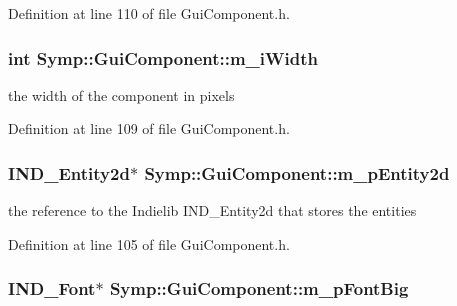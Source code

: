 Definition at line 110 of file Gui\-Component.\-h.

\hypertarget{class_symp_1_1_gui_component_ad4c3e34b824e1f9d6a030ca54fc1a7cf}{
\subsubsection[{m\-\_\-i\-Width}]{\setlength{\rightskip}{0pt plus 5cm}int Symp\-::\-Gui\-Component\-::m\-\_\-i\-Width\hspace{0.3cm}{\ttfamily [protected]}}}\label{class_symp_1_1_gui_component_ad4c3e34b824e1f9d6a030ca54fc1a7cf}
the width of the component in pixels 

Definition at line 109 of file Gui\-Component.\-h.

\hypertarget{class_symp_1_1_gui_component_ae2548627f8f866222e13347cc4284b24}{
\subsubsection[{m\-\_\-p\-Entity2d}]{\setlength{\rightskip}{0pt plus 5cm}I\-N\-D\-\_\-\-Entity2d$\ast$ Symp\-::\-Gui\-Component\-::m\-\_\-p\-Entity2d\hspace{0.3cm}{\ttfamily [protected]}}}\label{class_symp_1_1_gui_component_ae2548627f8f866222e13347cc4284b24}
the reference to the Indielib I\-N\-D\-\_\-\-Entity2d that stores the entities 

Definition at line 105 of file Gui\-Component.\-h.

\hypertarget{class_symp_1_1_gui_component_a784e1d58bb695ca95f12c1611f144488}{
\subsubsection[{m\-\_\-p\-Font\-Big}]{\setlength{\rightskip}{0pt plus 5cm}I\-N\-D\-\_\-\-Font$\ast$ Symp\-::\-Gui\-Component\-::m\-\_\-p\-Font\-Big\hspace{0.3cm}{\ttfamily [protected]}}}\label{class_symp_1_1_gui_component_a784e1d58bb695ca95f12c1611f144488}


